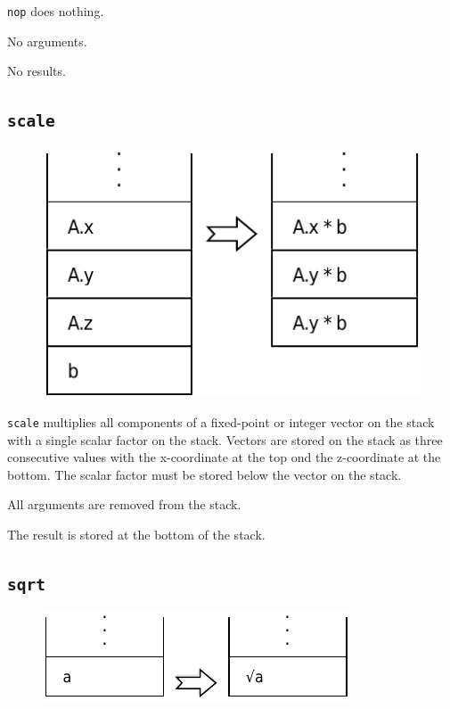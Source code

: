 			\texttt{nop} does nothing.
			
			No arguments.
			
			No results.
	
	\qquad
	
	\subsection*{\texttt{scale}}
	
		\begin{figure}
			\begin{flushright}
				\includegraphics[width=\linewidth]{figure/pdf/i_scale} 
			\end{flushright}
		\end{figure}
	
			\texttt{scale} multiplies all components of a fixed-point or
			integer vector on the stack with a single scalar factor on the
			stack. Vectors are stored on the stack as three consecutive values
			with the x-coordinate at the top ond the z-coordinate at the
			bottom. The scalar factor must be stored below the vector on the
			stack.
			
			All arguments are removed from the stack.
			
			The result is stored at the bottom of the stack.
	
	\qquad
	
	\subsection*{\texttt{sqrt}}
	
		\begin{figure}
			\begin{flushright}
				\includegraphics[width=\linewidth]{figure/pdf/i_sqrt} 
			\end{flushright}
		\end{figure}
	

